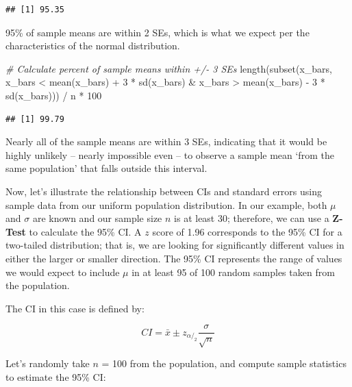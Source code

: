 \documentclass[
]{book}
\newenvironment{Shaded}{\begin{snugshade}}{\end{snugshade}}
\newcommand{\CommentTok}[1]{\textcolor[rgb]{0.56,0.35,0.01}{\textit{#1}}}
\newcommand{\DecValTok}[1]{\textcolor[rgb]{0.00,0.00,0.81}{#1}}
\newcommand{\FunctionTok}[1]{\textcolor[rgb]{0.00,0.00,0.00}{#1}}
\newcommand{\NormalTok}[1]{#1}
\newcommand{\SpecialCharTok}[1]{\textcolor[rgb]{0.00,0.00,0.00}{#1}}
\begin{document}
\begin{verbatim}
## [1] 95.35
\end{verbatim}

95\% of sample means are within 2 SEs, which is what we expect per the characteristics of the normal distribution.

\begin{Shaded}
\begin{Highlighting}[]
\CommentTok{\# Calculate percent of sample means within +/{-} 3 SEs}
\FunctionTok{length}\NormalTok{(}\FunctionTok{subset}\NormalTok{(x\_bars, x\_bars }\SpecialCharTok{\textless{}} \FunctionTok{mean}\NormalTok{(x\_bars) }\SpecialCharTok{+} \DecValTok{3} \SpecialCharTok{*} \FunctionTok{sd}\NormalTok{(x\_bars) }\SpecialCharTok{\&}\NormalTok{ x\_bars }\SpecialCharTok{\textgreater{}} \FunctionTok{mean}\NormalTok{(x\_bars) }\SpecialCharTok{{-}} \DecValTok{3} \SpecialCharTok{*} \FunctionTok{sd}\NormalTok{(x\_bars))) }\SpecialCharTok{/}\NormalTok{ n }\SpecialCharTok{*} \DecValTok{100}
\end{Highlighting}
\end{Shaded}

\begin{verbatim}
## [1] 99.79
\end{verbatim}

Nearly all of the sample means are within 3 SEs, indicating that it would be highly unlikely -- nearly impossible even -- to observe a sample mean `from the same population' that falls outside this interval.

Now, let's illustrate the relationship between CIs and standard errors using sample data from our uniform population distribution. In our example, both \(\mu\) and \(\sigma\) are known and our sample size \(n\) is at least 30; therefore, we can use a \textbf{Z-Test} to calculate the 95\% CI. A \(z\) score of 1.96 corresponds to the 95\% CI for a two-tailed distribution; that is, we are looking for significantly different values in either the larger or smaller direction. The 95\% CI represents the range of values we would expect to include \(\mu\) in at least 95 of 100 random samples taken from the population.

The CI in this case is defined by:

\[ CI = \bar{x} \pm z_{\alpha/_2} \frac{\sigma}{\sqrt{n}} \]

Let's randomly take \(n\) = 100 from the population, and compute sample statistics to estimate the 95\% CI:
\end{document}
